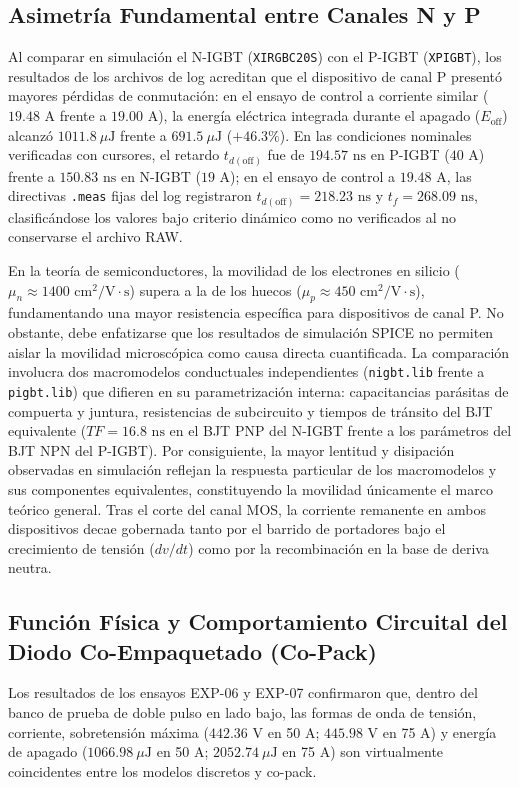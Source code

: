 \documentclass[11pt,a4paper]{article}
\begin{document}
\subsection{Asimetría Fundamental entre Canales N y P}
Al comparar en simulación el N-IGBT (\texttt{XIRGBC20S}) con el P-IGBT (\texttt{XPIGBT}), los resultados de los archivos de log acreditan que el dispositivo de canal P presentó mayores pérdidas de conmutación: en el ensayo de control a corriente similar ($19.48\text{ A}$ frente a $19.00\text{ A}$), la energía eléctrica integrada durante el apagado ($E_{\text{off}}$) alcanzó $1011.8\ \mu\text{J}$ frente a $691.5\ \mu\text{J}$ ($+46.3\%$). En las condiciones nominales verificadas con cursores, el retardo $t_{d(\text{off})}$ fue de $194.57\text{ ns}$ en P-IGBT ($40\text{ A}$) frente a $150.83\text{ ns}$ en N-IGBT ($19\text{ A}$); en el ensayo de control a $19.48\text{ A}$, las directivas \texttt{.meas} fijas del log registraron $t_{d(\text{off})} = 218.23\text{ ns}$ y $t_f = 268.09\text{ ns}$, clasificándose los valores bajo criterio dinámico como no verificados al no conservarse el archivo RAW.

En la teoría de semiconductores, la movilidad de los electrones en silicio ($\mu_n \approx 1400\text{ cm}^2/\text{V}\cdot\text{s}$) supera a la de los huecos ($\mu_p \approx 450\text{ cm}^2/\text{V}\cdot\text{s}$), fundamentando una mayor resistencia específica para dispositivos de canal P. No obstante, debe enfatizarse que los resultados de simulación SPICE no permiten aislar la movilidad microscópica como causa directa cuantificada. La comparación involucra dos macromodelos conductuales independientes (\texttt{nigbt.lib} frente a \texttt{pigbt.lib}) que difieren en su parametrización interna: capacitancias parásitas de compuerta y juntura, resistencias de subcircuito y tiempos de tránsito del BJT equivalente ($TF = 16.8\text{ ns}$ en el BJT PNP del N-IGBT frente a los parámetros del BJT NPN del P-IGBT). Por consiguiente, la mayor lentitud y disipación observadas en simulación reflejan la respuesta particular de los macromodelos y sus componentes equivalentes, constituyendo la movilidad únicamente el marco teórico general. Tras el corte del canal MOS, la corriente remanente en ambos dispositivos decae gobernada tanto por el barrido de portadores bajo el crecimiento de tensión ($dv/dt$) como por la recombinación en la base de deriva neutra.

\subsection{Función Física y Comportamiento Circuital del Diodo Co-Empaquetado (Co-Pack)}
Los resultados de los ensayos EXP-06 y EXP-07 confirmaron que, dentro del banco de prueba de doble pulso en lado bajo, las formas de onda de tensión, corriente, sobretensión máxima ($442.36\text{ V}$ en 50 A; $445.98\text{ V}$ en 75 A) y energía de apagado ($1066.98\ \mu\text{J}$ en 50 A; $2052.74\ \mu\text{J}$ en 75 A) son virtualmente coincidentes entre los modelos discretos y co-pack.
\end{document}
